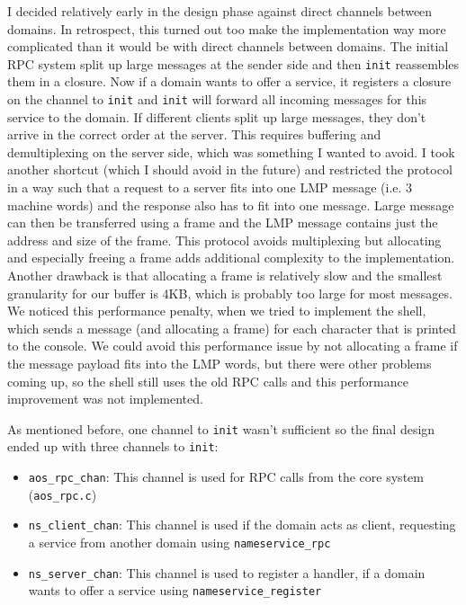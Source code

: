 I decided relatively early in the design phase against direct channels between domains. In retrospect, this turned out too make
the implementation way more complicated than it would be with direct channels between domains. The initial RPC system split up large
messages at the sender side and then \verb|init| reassembles them in a closure. Now if a domain wants to offer a service, it registers
a closure on the channel to \verb|init| and \verb|init| will forward all incoming messages for this service to the domain. If different
clients split up large messages, they don't arrive in the correct order at the server. This requires buffering and demultiplexing
on the server side, which was something I wanted to avoid. I took another shortcut (which I should avoid in the future) and restricted
the protocol in a way such that a request to a server fits into one LMP message (i.e. 3 machine words) and the response also has to 
fit into one message. Large message can then be transferred using a frame and the LMP message contains just the address and size of
the frame. This protocol avoids multiplexing but allocating and especially freeing a frame adds additional complexity to the 
implementation. Another drawback is that allocating a frame is relatively slow and the smallest granularity for our buffer is 4KB,
which is probably too large for most messages. We noticed this performance penalty, when we tried to implement the shell, which
sends a message (and allocating a frame) for each character that is printed to the console. We could avoid this performance issue
by not allocating a frame if the message payload fits into the LMP words, but there were other problems coming up, so the shell
still uses the old RPC calls and this performance improvement was not implemented.

As mentioned before, one channel to \verb|init| wasn't sufficient so the final design ended up with three channels to \verb|init|:

\begin{itemize}
    \item \verb|aos_rpc_chan|: This channel is used for RPC calls from the core system (\verb|aos_rpc.c|)
    \item \verb|ns_client_chan|: This channel is used if the domain acts as client, requesting a service from another domain using 
        \verb|nameservice_rpc|
    \item \verb|ns_server_chan|: This channel is used to register a handler, if a domain wants to offer a service using 
        \verb|nameservice_register|
\end{itemize}

